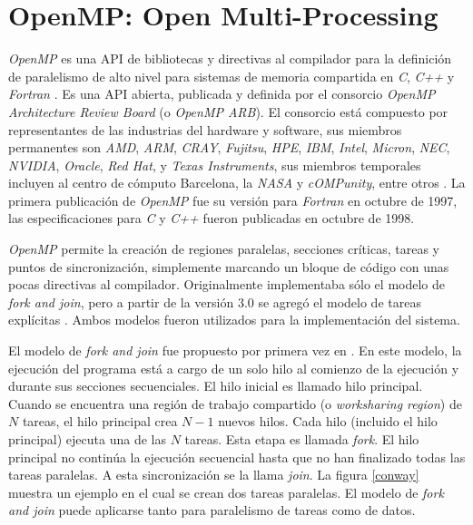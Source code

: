 
\section{OpenMP: Open Multi-Processing}

\label{mt_openmp}

\emph{OpenMP} es una API de bibliotecas y directivas al compilador para la
definición de paralelismo de alto nivel para sistemas de memoria compartida en
\emph{C}, \emph{C++} y \emph{Fortran} \cite{ompWeb}. Es una API abierta,
publicada y definida por el consorcio \emph{OpenMP Architecture Review Board}
(o \emph{OpenMP ARB}). El consorcio está compuesto por representantes de las
industrias del hardware y software, sus miembros permanentes son \emph{AMD},
\emph{ARM}, \emph{CRAY}, \emph{Fujitsu}, \emph{HPE}, \emph{IBM}, \emph{Intel},
\emph{Micron}, \emph{NEC}, \emph{NVIDIA}, \emph{Oracle}, \emph{Red Hat}, y
\emph{Texas Instruments}, sus miembros temporales incluyen al centro de
cómputo Barcelona, la \emph{NASA} y \emph{cOMPunity}, entre otros
\cite{ompWeb}. La primera publicación de \emph{OpenMP} fue su versión para
\emph{Fortran} en octubre de 1997, las especificaciones para \emph{C} y
\emph{C++} fueron publicadas en octubre de 1998.

\emph{OpenMP} permite la creación de regiones paralelas, secciones críticas,
tareas y puntos de sincronización, simplemente marcando un bloque de código
con unas pocas directivas al compilador. Originalmente implementaba sólo el
modelo de \emph{fork and join}, pero a partir de la versión 3.0 se agregó el
modelo de tareas explícitas \cite{openmp08}. Ambos modelos fueron utilizados
para la implementación del sistema.

El modelo de \emph{fork and join} fue propuesto por primera vez en
\cite{conway1963}. En este modelo, la ejecución del programa está a cargo de un
solo hilo al comienzo de la ejecución y durante sus secciones secuenciales. El
hilo inicial es llamado hilo principal. Cuando se encuentra una región de
trabajo compartido (o \emph{worksharing region}) de $N$ tareas, el hilo
principal crea $N-1$ nuevos hilos. Cada hilo (incluido el hilo principal)
ejecuta una de las $N$ tareas.  Esta etapa es llamada \emph{fork}. El hilo
principal no continúa la ejecución secuencial hasta que no han finalizado todas
las tareas paralelas. A esta sincronización se la llama \emph{join}. La figura
\ref{conway} muestra un ejemplo en el cual se crean dos tareas paralelas. El
modelo de \emph{fork and join} puede aplicarse tanto para paralelismo de tareas
como de datos.

